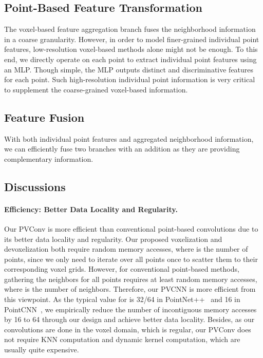 \documentclass{article}
\def\modelshort{PVCNN\xspace}
\def\convshort{PVConv\xspace}
\begin{document}
\subsection{Point-Based Feature Transformation}

The voxel-based feature aggregation branch fuses the neighborhood information in a coarse granularity. However, in order to model finer-grained individual point features, low-resolution voxel-based methods alone might not be enough. To this end, we directly operate on each point to extract individual point features using an MLP. Though simple, the MLP outputs distinct and discriminative features for each point. Such high-resolution individual point information is very critical to supplement the coarse-grained voxel-based information. 

\subsection{Feature Fusion}

With both individual point features and aggregated neighborhood information, we can efficiently fuse two branches with an addition as they are providing complementary information.


\subsection{Discussions}

\paragraph{Efficiency: Better Data Locality and Regularity.}

Our \convshort is more efficient than conventional point-based convolutions due to its better data locality and regularity. Our proposed voxelization and devoxelization both require  random memory accesses, where  is the number of points, since we only need to iterate over all points once to scatter them to their corresponding voxel grids. However, for conventional point-based methods, gathering the neighbors for all points requires at least  random memory accesses, where  is the number of neighbors. Therefore, our \modelshort is  more efficient from this viewpoint. As the typical value for  is 32/64 in PointNet++~\cite{Qi:2017tf} and 16 in PointCNN~\cite{Li:2018tp}, we empirically reduce the number of incontiguous memory accesses by 16 to 64 through our design and achieve better data locality. Besides, as our convolutions are done in the voxel domain, which is regular, our \convshort does not require KNN computation and dynamic kernel computation, which are usually quite expensive.
\end{document}
